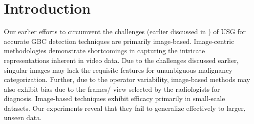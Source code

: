 
\section{Introduction}

%

%

%
Our earlier efforts to circumvent the challenges (earlier discussed in ) of USG for accurate GBC detection techniques are primarily image-based. 
Image-centric methodologies demonstrate shortcomings in capturing the intricate representations inherent in video data. Due to the challenges discussed earlier, singular images may lack the requisite features for unambiguous malignancy categorization. Further, due to the operator variability, image-based methods may also exhibit bias due to the frames/ view selected by the radiologists for diagnosis. Image-based techniques exhibit efficacy primarily in small-scale datasets. Our experiments reveal that they fail to generalize effectively to larger, unseen data. 

